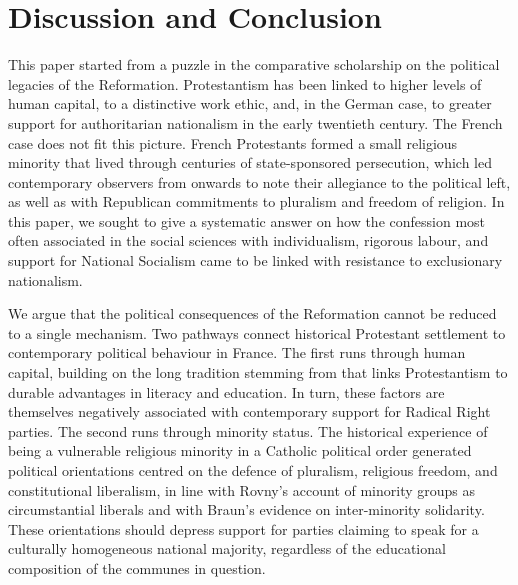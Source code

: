\documentclass[12pt]{article}
\begin{document}
\section{Discussion and Conclusion}
This paper started from a puzzle in the comparative scholarship on the political legacies of the Reformation. Protestantism has been linked to higher levels of human capital, to a distinctive work ethic, and, in the German case, to greater support for authoritarian nationalism in the early twentieth century. The French case does not fit this picture. French Protestants formed a small religious minority that lived through centuries of state-sponsored persecution, which led contemporary observers from \textcite{siegfriedGeographieElectoraleLArdeche1949} onwards to note their allegiance to the political left, as well as with Republican commitments to pluralism and freedom of religion. In this paper, we sought to give a systematic answer on how the confession most often associated in the social sciences with individualism, rigorous labour, and support for National Socialism came to be linked with resistance to exclusionary nationalism.

We argue that the political consequences of the Reformation cannot be reduced to a single mechanism. Two pathways connect historical Protestant settlement to contemporary political behaviour in France. The first runs through human capital, building on the long tradition stemming from \textcite{beckerWasWeberWrong2009} that links Protestantism to durable advantages in literacy and education. In turn, these factors are themselves negatively associated with contemporary support for Radical Right parties. The second runs through minority status. The historical experience of being a vulnerable religious minority in a Catholic political order generated political orientations centred on the defence of pluralism, religious freedom, and constitutional liberalism, in line with Rovny's \parencite*{rovnyEthnicMinoritiesPolitical2024, rovnyAntidoteBackslidingEthnic2023} account of minority groups as circumstantial liberals and with Braun's \parencite*{braunProtectorsPluralismReligious2019, braunReligiousMinoritiesResistance2016} evidence on inter-minority solidarity. These orientations should depress support for parties claiming to speak for a culturally homogeneous national majority, regardless of the educational composition of the communes in question.
\end{document}
